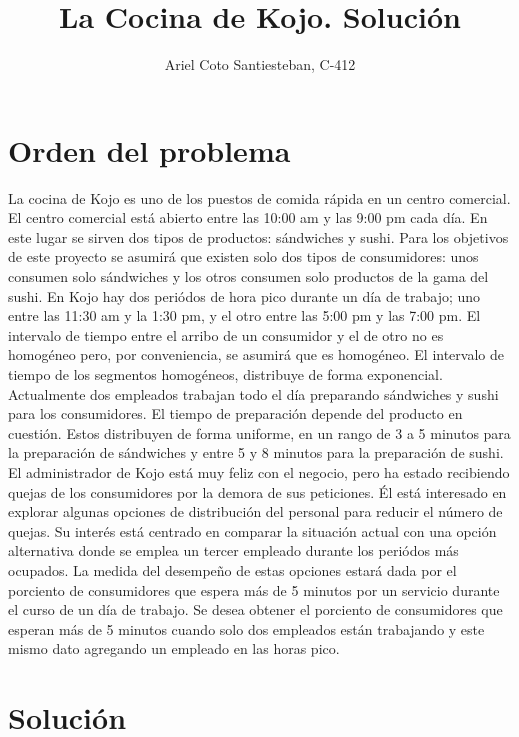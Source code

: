 \documentclass[11pt]{article}
\title{La Cocina de Kojo. Soluci\'on}
\author{Ariel Coto Santiesteban, C-412}
\begin{document}
\maketitle
\section{Orden del problema}
La cocina de Kojo es uno de los puestos de comida r\'apida en un centro
comercial. El centro comercial est\'a abierto entre las 10:00 am y las 9:00 pm cada
d\'ia. En este lugar se sirven dos tipos de productos: s\'andwiches y sushi. Para los
objetivos de este proyecto se asumir\'a que existen solo dos tipos de consumidores:
unos consumen solo s\'andwiches y los otros consumen solo productos de la gama
del sushi. En Kojo hay dos peri\'odos de hora pico durante un d\'ia de trabajo;
uno entre las 11:30 am y la 1:30 pm, y el otro entre las 5:00 pm y las 7:00
pm. El intervalo de tiempo entre el arribo de un consumidor y el de otro no es
homog\'eneo pero, por conveniencia, se asumir\'a que es homog\'eneo. El intervalo
de tiempo de los segmentos homog\'eneos, distribuye de forma exponencial.
Actualmente dos empleados trabajan todo el d\'ia preparando s\'andwiches y
sushi para los consumidores. El tiempo de preparaci\'on depende del producto en
cuesti\'on. Estos distribuyen de forma uniforme, en un rango de 3 a 5 minutos
para la preparaci\'on de s\'andwiches y entre 5 y 8 minutos para la preparaci\'on de
sushi.
El administrador de Kojo est\'a muy feliz con el negocio, pero ha estado recibiendo 
quejas de los consumidores por la demora de sus peticiones. \'El est\'a 
interesado en explorar algunas opciones de distribuci\'on del personal para reducir
el n\'umero de quejas. Su inter\'es est\'a centrado en comparar la situaci\'on actual con
una opci\'on alternativa donde se emplea un tercer empleado durante los peri\'odos
m\'as ocupados. La medida del desempe\~no de estas opciones estar\'a dada por el
porciento de consumidores que espera m\'as de 5 minutos por un servicio durante
el curso de un d\'ia de trabajo.
Se desea obtener el porciento de consumidores que esperan m\'as de 5 minutos
cuando solo dos empleados est\'an trabajando y este mismo dato agregando un
empleado en las horas pico.
\section{Soluci\'on}
\end{document}

